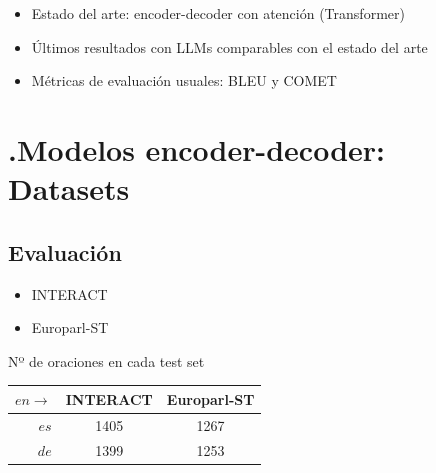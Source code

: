 \documentclass[landscape,spanish]{article}
\begin{document}
\begin{itemize}\itemsep=10mm

    \item Estado del arte: encoder-decoder con atención (Transformer)

    \item Últimos resultados con LLMs comparables con el estado del arte

    \item Métricas de evaluación usuales: BLEU y COMET
\end{itemize}



\cp %
\section*{\thesection.\quad Modelos encoder-decoder: Datasets}
\vspace*{10mm}

\subsection*{Evaluación}
\vspace*{10mm}

\flushleft
\begin{minipage}{0.25\linewidth}
\vspace{-10mm}
\begin{itemize}
    \item INTERACT
    \item Europarl-ST
\end{itemize}
\end{minipage}
%
\begin{minipage}[h]{0.5\linewidth}
    \centering
    Nº de oraciones en cada test set \\
    \vspace{6mm}
	\begin{tabular}{r||cc}
	       $en \rightarrow$ & INTERACT & Europarl-ST \\ \hline
		   $es$  & 1405 & 1267  \\ 
		   $de$  & 1399 & 1253  \\
	\end{tabular} 
    \label{table:test-datasets}
\end{minipage}
\end{document}
